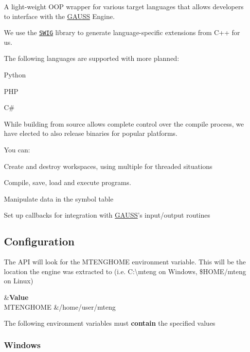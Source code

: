 A light-\/weight O\-O\-P wrapper for various target languages that allows developers to interface with the \hyperlink{class_g_a_u_s_s}{G\-A\-U\-S\-S} Engine.

We use the \href{http://www.swig.org}{\tt S\-W\-I\-G} library to generate language-\/specific extensions from C++ for us.

The following languages are supported with more planned\-:


\begin{DoxyItemize}
\item Python
\item P\-H\-P
\item C\#
\end{DoxyItemize}

While building from source allows complete control over the compile process, we have elected to also release binaries for popular platforms.

You can\-:
\begin{DoxyItemize}
\item Create and destroy workspaces, using multiple for threaded situations
\item Compile, save, load and execute programs.
\item Manipulate data in the symbol table
\item Set up callbacks for integration with \hyperlink{class_g_a_u_s_s}{G\-A\-U\-S\-S}'s input/output routines
\end{DoxyItemize}

\subsection*{Configuration}

The A\-P\-I will look for the {\ttfamily M\-T\-E\-N\-G\-H\-O\-M\-E} environment variable. This will be the location the engine was extracted to (i.\-e. {\ttfamily C\-:\textbackslash{}mteng} on Windows, {\ttfamily \$\-H\-O\-M\-E/mteng} on Linux)

\begin{TabularC}{2}
\hline
{}&{\bf Value}\\
{\ttfamily M\-T\-E\-N\-G\-H\-O\-M\-E} &{\ttfamily /home/user/mteng} \\
\end{TabularC}


The following environment variables must {\bfseries contain} the specified values

\subsubsection*{Windows}

